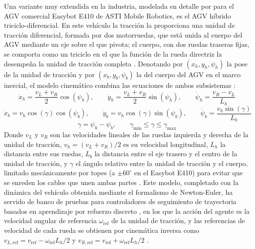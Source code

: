 Una variante muy extendida en la industria, modelada en detalle por \citet{sanchez2022modelado} para el AGV comercial Easybot E410 de ASTI Mobile Robotics, es el AGV híbrido triciclo-diferencial. En este vehículo la tracción la proporciona una unidad de tracción diferencial, formada por dos motorruedas, que está unida al cuerpo del AGV mediante un eje sobre el que pivota; el cuerpo, con dos ruedas traseras fijas, se comporta como un triciclo en el que la función de la rueda directriz la desempeña la unidad de tracción completa \citep{sierragarcia2024combining, sierragarcia2023development}. Denotando por $(x_h, y_h, \psi_h)$ la pose de la unidad de tracción y por $(x_b, y_b, \psi_b)$ la del cuerpo del AGV en el marco inercial, el modelo cinemático combina las ecuaciones de ambos subsistemas \citep{sierragarcia2024combining, sanchez2022modelado}:
\begin{equation}
    \dot{x}_h = \frac{v_L + v_R}{2} \cos(\psi_h), \qquad
    \dot{y}_h = \frac{v_L + v_R}{2} \sin(\psi_h), \qquad
    \dot{\psi}_h = \frac{v_R - v_L}{L_h}
\end{equation}
\begin{equation}
    \dot{x}_b = v_h \cos(\gamma) \cos(\psi_b), \qquad
    \dot{y}_b = v_h \cos(\gamma) \sin(\psi_b), \qquad
    \dot{\psi}_b = \frac{v_h \sin(\gamma)}{L_b}
\end{equation}
\begin{equation}
    \gamma = \psi_h - \psi_b, \qquad \gamma_{\min} \leq \gamma \leq \gamma_{\max}
\end{equation}
Donde $v_L$ y $v_R$ son las velocidades lineales de las ruedas izquierda y derecha de la unidad de tracción, $v_h = (v_L + v_R)/2$ es su velocidad longitudinal, $L_h$ la distancia entre sus ruedas, $L_b$ la distancia entre el eje trasero y el centro de la unidad de tracción, y $\gamma$ el ángulo relativo entre la unidad de tracción y el cuerpo, limitado mecánicamente por topes (a $\pm 60^\circ$ en el Easybot E410) para evitar que se enreden los cables que unen ambas partes \citep{sanchez2022modelado}. Este modelo, completado con la dinámica del vehículo obtenida mediante el formalismo de Newton-Euler, ha servido de banco de pruebas para controladores de seguimiento de trayectoria basados en aprendizaje por refuerzo discreto \citep{sierragarcia2024combining, sierragarcia2024federated}, en los que la acción del agente es la velocidad angular de referencia $\omega_{\mathrm{ref}}$ de la unidad de tracción, y las referencias de velocidad de cada rueda se obtienen por cinemática inversa como $v_{L,\mathrm{ref}} = v_{\mathrm{ref}} - \omega_{\mathrm{ref}} L_h / 2$ y $v_{R,\mathrm{ref}} = v_{\mathrm{ref}} + \omega_{\mathrm{ref}} L_h / 2$ \citep{sierragarcia2024combining}.

